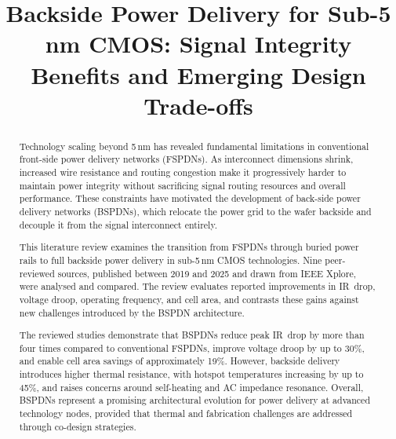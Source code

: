 \documentclass[conference,a4paper]{IEEEtran}
\begin{document}
\title{Backside Power Delivery for Sub-5 nm CMOS: Signal Integrity Benefits and Emerging Design Trade-offs}

\author{
\and
{}
}

\maketitle

\begin{abstract}
Technology scaling beyond 5\,nm has revealed fundamental limitations in conventional front-side power delivery networks (FSPDNs). As interconnect dimensions shrink, increased wire resistance and routing congestion make it progressively harder to maintain power integrity without sacrificing signal routing resources and overall performance. These constraints have motivated the development of back-side power delivery networks (BSPDNs), which relocate the power grid to the wafer backside and decouple it from the signal interconnect entirely.

This literature review examines the transition from FSPDNs through buried power rails to full backside power delivery in sub-5\,nm CMOS technologies. Nine peer-reviewed sources, published between 2019 and 2025 and drawn from IEEE Xplore, were analysed and compared. The review evaluates reported improvements in IR~drop, voltage droop, operating frequency, and cell area, and contrasts these gains against new challenges introduced by the BSPDN architecture.

The reviewed studies demonstrate that BSPDNs reduce peak IR~drop by more than four times compared to conventional FSPDNs, improve voltage droop by up to 30\%, and enable cell area savings of approximately 19\%. However, backside delivery introduces higher thermal resistance, with hotspot temperatures increasing by up to 45\%, and raises concerns around self-heating and AC impedance resonance. Overall, BSPDNs represent a promising architectural evolution for power delivery at advanced technology nodes, provided that thermal and fabrication challenges are addressed through co-design strategies.
\end{abstract}
\end{document}
